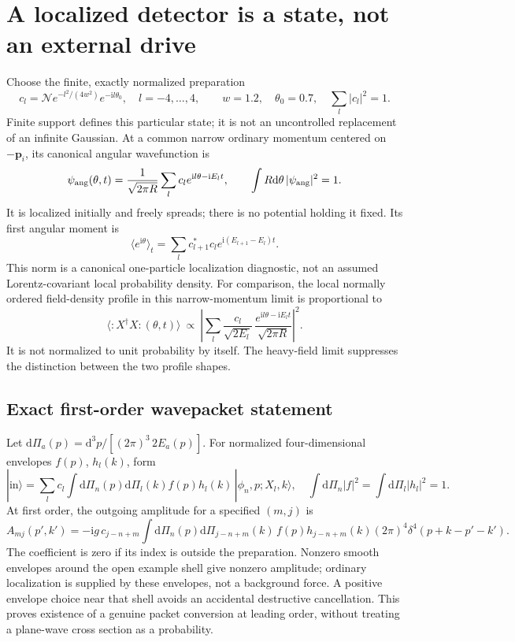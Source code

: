 \documentclass[11pt,a4paper]{article}
\newcommand{\dd}{\mathrm d}
\newcommand{\ii}{\mathrm i}
\begin{document}
\section{A localized detector is a state, not an external drive}
Choose the finite, exactly normalized preparation
\begin{equation}\label{eq:packet}
 c_l=\mathcal N e^{-l^2/(4w^2)}e^{-\ii l\theta_0},
 \quad l=-4,\ldots,4,\qquad
 w=1.2,\quad\theta_0=0.7,\quad \sum_l|c_l|^2=1 .
\end{equation}
Finite support defines this particular state; it is not an
uncontrolled replacement of an infinite Gaussian. At a common
narrow ordinary momentum centered on $-\boldsymbol p_i$, its
canonical angular wavefunction is
\begin{equation}
 \psi_{\rm ang}(\theta,t)=\frac1{\sqrt{2\pi R}}
 \sum_l c_l e^{\ii l\theta-\ii E_l t},\qquad
 \int R\dd\theta\,|\psi_{\rm ang}|^2=1.
\end{equation}
It is localized initially and freely spreads; there is no potential
holding it fixed. Its first angular moment is
\begin{equation}
 \langle e^{\ii\theta}\rangle_t
 =\sum_l c_{l+1}^*c_l e^{\ii(E_{l+1}-E_l)t}.
\end{equation}
This norm is a canonical one-particle localization diagnostic, not
an assumed Lorentz-covariant local probability density.
For comparison, the local normally ordered field-density profile
in this narrow-momentum limit is proportional to
\begin{equation}
 \langle :X^\dagger X:(\theta,t)\rangle
 \ \propto\
 \left|\sum_l\frac{c_l}{\sqrt{2E_l}}\,
          \frac{e^{\ii l\theta-\ii E_l t}}{\sqrt{2\pi R}}\right|^2 .
\end{equation}
It is not normalized to unit probability by itself. The heavy-field
limit suppresses the distinction between the two profile shapes.

\subsection*{Exact first-order wavepacket statement}
Let $\dd\Pi_a(p)=\dd^3p/[(2\pi)^3\,2E_a(p)]$.
For normalized four-dimensional envelopes $f(p)$, $h_l(k)$, form
\begin{equation}
 |\mathrm{in}\rangle=\sum_l c_l\int\dd\Pi_n(p)\dd\Pi_l(k)
 f(p)h_l(k)\,|\phi_n,p;X_l,k\rangle ,
 \quad \int\dd\Pi_n|f|^2=\int\dd\Pi_l|h_l|^2=1.
\end{equation}
At first order, the outgoing amplitude for a specified $(m,j)$ is
\begin{equation}\label{eq:waveamp}
 A_{mj}(p',k')=-\ii g\,c_{j-n+m}
 \int\dd\Pi_n(p)\dd\Pi_{j-n+m}(k)\,
 f(p)h_{j-n+m}(k)(2\pi)^4\delta^4(p+k-p'-k').
\end{equation}
The coefficient is zero if its index is outside the preparation.
Nonzero smooth envelopes around the open example shell give
nonzero amplitude; ordinary localization is supplied by these
envelopes, not a background force. A positive envelope choice near
that shell avoids an accidental destructive cancellation.
This proves existence of a genuine packet conversion at leading
order, without treating a plane-wave cross section as a probability.
\end{document}
